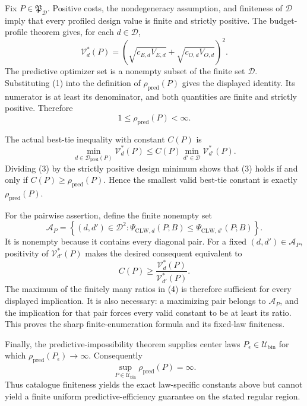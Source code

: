 Fix \(P\in\mathfrak P_{\mathcal D}\).  Positive costs, the nondegeneracy assumption, and finiteness of \(\mathcal D\) imply that every profiled design value is finite and strictly positive.  The budget-profile theorem gives, for each \(d\in\mathcal D\),
\[
 \mathcal V_d^*(P)
 =\left(\sqrt{c_{E,d}V_{E,d}}+
 \sqrt{c_{O,d}V_{O,d}}\right)^2. \tag{1}
\]
The predictive optimizer set is a nonempty subset of the finite set \(\mathcal D\).  Substituting (1) into the definition of \(\rho_{\mathrm{pred}}(P)\) gives the displayed identity.  Its numerator is at least its denominator, and both quantities are finite and strictly positive.  Therefore
\[
 1\le\rho_{\mathrm{pred}}(P)<\infty. \tag{2}
\]

The actual best-tie inequality with constant \(C(P)\) is
\[
 \min_{d\in\mathcal D_{\mathrm{pred}}(P)}\mathcal V_d^*(P)
 \le C(P)\min_{d'\in\mathcal D}\mathcal V_{d'}^*(P). \tag{3}
\]
Dividing (3) by the strictly positive design minimum shows that (3) holds if and only if \(C(P)\ge\rho_{\mathrm{pred}}(P)\).  Hence the smallest valid best-tie constant is exactly \(\rho_{\mathrm{pred}}(P)\).

For the pairwise assertion, define the finite nonempty set
\[
 \mathcal A_P=\left\{(d,d')\in\mathcal D^2:
 \Psi_{\mathrm{CLW},d}(P;B)
 \le\Psi_{\mathrm{CLW},d'}(P;B)\right\}.
\]
It is nonempty because it contains every diagonal pair.  For a fixed \((d,d')\in\mathcal A_P\), positivity of \(\mathcal V_{d'}^*(P)\) makes the desired consequent equivalent to
\[
 C(P)\ge\frac{\mathcal V_d^*(P)}{\mathcal V_{d'}^*(P)}. \tag{4}
\]
The maximum of the finitely many ratios in (4) is therefore sufficient for every displayed implication.  It is also necessary: a maximizing pair belongs to \(\mathcal A_P\), and the implication for that pair forces every valid constant to be at least its ratio.  This proves the sharp finite-enumeration formula and its fixed-law finiteness.

Finally, the predictive-impossibility theorem supplies center laws \(P_\epsilon\in\mathcal U_{\mathrm{bin}}\) for which \(\rho_{\mathrm{pred}}(P_\epsilon)\to\infty\).  Consequently
\[
 \sup_{P\in\mathcal U_{\mathrm{bin}}}\rho_{\mathrm{pred}}(P)=\infty.
\]
Thus catalogue finiteness yields the exact law-specific constants above but cannot yield a finite uniform predictive-efficiency guarantee on the stated regular region.
